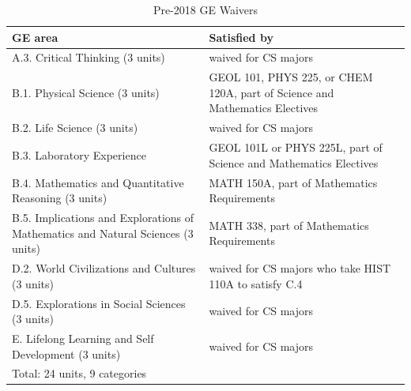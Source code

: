 \documentclass{book}
\begin{document}
\begin{table}
\caption{Pre-2018 GE Waivers}
\begin{center}
\begin{tabular}{| p{3in} | p{3in} |} \hline
  \textbf{GE area} & \textbf{Satisfied by} \\ \hline
  A.3. Critical Thinking (3 units) & waived for CS majors \\ \hline
  B.1. Physical Science (3 units) & GEOL 101, PHYS 225, or CHEM 120A, part of Science and Mathematics Electives \\ \hline
  B.2. Life Science (3 units) & waived for CS majors \\ \hline
  B.3. Laboratory Experience & GEOL 101L or PHYS 225L, part of Science and Mathematics Electives \\ \hline
  B.4. Mathematics and Quantitative Reasoning (3 units) & MATH 150A, part of Mathematics Requirements \\ \hline
  B.5. Implications and Explorations of Mathematics and Natural Sciences (3 units) & MATH 338, part of Mathematics Requirements \\ \hline
  D.2. World Civilizations and Cultures (3 units) & waived for CS majors who take HIST 110A to satisfy C.4 \\ \hline
  D.5. Explorations in Social Sciences (3 units) & waived for CS majors \\ \hline
  E. Lifelong Learning and Self Development (3 units) & waived for CS majors \\ \hline
  \multicolumn{2}{|l|}{Total: 24 units, 9 categories} \\ \hline
\end{tabular}
\end{center}
\end{table}
\end{document}
